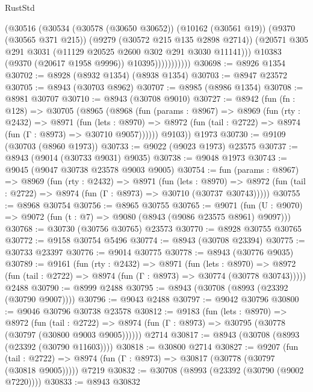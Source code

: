 \begin{lexlean}{RustStd}
\begin{coremodule}
{\begin{coremodule}
{{{{{{{{{{{{{{{{{{{{{{{{{{{{{{{{{{{{{{{                        (@30516
                          (@30534
                            (@30578 (@30650 @30652))
                            (@10162 (@30561 @19))
                            (@9370 (@30565 @371 @215))
                            (@9279 (@30572 @215 @135 @2898 @2714))
                            (@20571 @305 @291 @3031 (@11129 @20525 @2600 @302 @291 @3030 @11141)))
                          @10383
                          (@9370 (@20617 @1958 @9996))
                          @10395)))))))))))
@30698 := @8926 @1354
@30702 := @8928 (@8932 @1354) (@8938 @1354)
@30703 := @8947 @23572
@30705 := @8943 (@30703 @8962)
@30707 := @8985 (@8986 @1354)
@30708 := @8981 @30707
@30710 := @8943 (@30708 @9010)
@30727 := @8942
    (fun (fn : @128) =>
    @30705
      (@8965
        (@8968
          (fun (params : @8967) =>
          @8969
            (fun (rty : @2432) =>
            @8971
              (fun (lets : @8970) =>
              @8972 (fun (tail : @2722) => @8974 (fun (Γ : @8973) => @30710 @9057))))))
        @9103))
    @1973
@30730 := @9109 (@30703 (@8960 @1973))
@30733 := @9022 (@9023 @1973) @23575
@30737 := @8943 (@9014 (@30733 @9031) @9035)
@30738 := @9048 @1973
@30743 := @9045 (@9047 @30738 @23578 @9003 @9005)
@30754 := fun (params : @8967) =>
  @8969
    (fun (rty : @2432) =>
    @8971
      (fun (lets : @8970) =>
      @8972 (fun (tail : @2722) => @8974 (fun (Γ : @8973) => @30710 (@30737 @30743)))))
@30755 := @8968 @30754
@30756 := @8965 @30755
@30765 := @9071
    (fun (U : @9070) => @9072 (fun (t : @7) => @9080 (@8943 (@9086 @23575 @8961) @9097)))
@30768 := @30730 (@30756 @30765) @23573
@30770 := @8928 @30755 @30765
@30772 := @9158 @30754 @5496
@30774 := @8943 (@30708 @23394)
@30775 := @30733 @23397
@30776 := @9014 @30775
@30778 := @8943 (@30776 @9035)
@30789 := @9161
    (fun (rty : @2432) =>
    @8971
      (fun (lets : @8970) =>
      @8972 (fun (tail : @2722) => @8974 (fun (Γ : @8973) => @30774 (@30778 @30743)))))
    @2488
@30790 := @8999 @2488
@30795 := @8943 (@30708 (@8993 (@23392 (@30790 @9007))))
@30796 := @9043 @2488
@30797 := @9042 @30796
@30800 := @9046 @30796 @30738 @23578
@30812 := @9183
    (fun (lets : @8970) =>
    @8972
      (fun (tail : @2722) =>
      @8974 (fun (Γ : @8973) => @30795 (@30778 (@30797 (@30800 @9003 @9005))))))
    @2714
@30817 := @8943 (@30708 (@8993 (@23392 (@30790 @11603))))
@30818 := @30800 @2714
@30827 := @9207
    (fun (tail : @2722) => @8974 (fun (Γ : @8973) => @30817 (@30778 (@30797 (@30818 @9005)))))
    @7219
@30832 := @30708 (@8993 (@23392 (@30790 (@9002 @7220))))
@30833 := @8943 @30832
}}}}}}}}}}}}}}}}}}}}}}}}}}}}}}}}}}}}}}}
\end{coremodule}}
\end{coremodule}
\end{lexlean}
